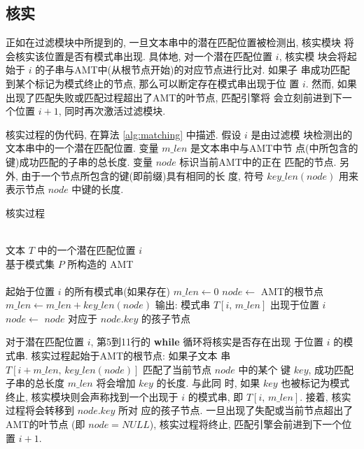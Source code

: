 \subsection{核实}
\label{subsec:matching}

正如在过滤模块中所提到的, 一旦文本串中的潜在匹配位置被检测出, 核实模块
将会核实该位置是否有模式串出现. 具体地, 对一个潜在匹配位置 $i$, 核实模
块会将起始于 $i$ 的子串与AMT中(从根节点开始)的对应节点进行比对. 如果子
串成功匹配到某个标记为模式终止的节点, 那么可以断定存在模式串出现于位
置 $i$. 然而, 如果出现了匹配失败或匹配过程超出了AMT的叶节点, 匹配引擎将
会立刻前进到下一个位置 $i+1$, 同时再次激活过滤模块.

核实过程的伪代码, 在算法 \ref{alg:matching} 中描述. 假设 $i$ 是由过滤模
块检测出的文本串中的一个潜在匹配位置. 变量 $m\_len$ 是文本串中与AMT中节
点(中所包含的键)成功匹配的子串的总长度. 变量 $node$ 标识当前AMT中的正在
匹配的节点. 另外, 由于一个节点所包含的键(即前缀)具有相同的长
度, 符号 $key\_len(node)$ 用来表示节点 $node$ 中键的长度.

\begin{algorithm}
  \caption{核实过程}\scriptsize
  \label{alg:matching}
  \begin{algorithmic}[1]
    \REQUIRE ~~\\
    文本 $T$ 中的一个潜在匹配位置 $i$ \\
    基于模式集 $P$ 所构造的 AMT\\
    \ENSURE ~~\\
    起始于位置 $i$ 的所有模式串(如果存在)
    \STATE
    \STATE $m\_len \leftarrow 0$
    \STATE $node \leftarrow $ AMT的根节点
    \STATE
    \STATE $m\_len \leftarrow m\_len + key\_len(node)$
    \STATE 输出: 模式串 $T[i,\,m\_len]$ 出现于位置 $i$
    \ENDIF
    \STATE $node \leftarrow$  $node$ 对应于 $node.key$ 的孩子节点
    \ENDWHILE
  \end{algorithmic}
\end{algorithm}

对于潜在匹配位置 $i$, 第5到11行的 \textbf{while} 循环将核实是否存在出现
于位置 $i$ 的模式串. 核实过程起始于AMT的根节点: 如果子文本
串 $T[i+m\_len, \, key\_len(node)]$ 匹配了当前节点 $node$ 中的某个
键 $key$, 成功匹配子串的总长度 $m\_len$ 将会增加 $key$ 的长度. 与此同
时, 如果 $key$ 也被标记为模式终止, 核实模块则会声称找到一个出现于 $i$
的模式串, 即 $T[i,\,m\_len]$. 接着, 核实过程将会转移到 $node.key$ 所对
应的孩子节点. 一旦出现了失配或当前节点超出了AMT的叶节点 (即 $node =
NULL$), 核实过程将终止, 匹配引擎会前进到下一个位置 $i+1$.

